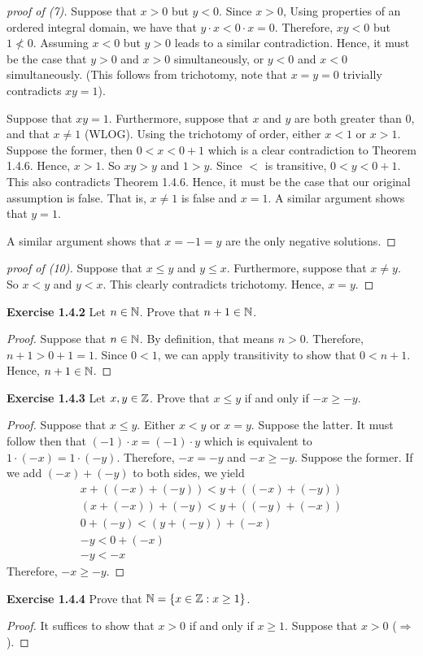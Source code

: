 \begin{proof}[proof of (7)]
    Suppose that \(x > 0\) but \(y < 0\). Since \(x > 0\), Using properties of an ordered integral domain, we have that \(y \cdot x < 0 \cdot x = 0\). Therefore, \(xy < 0\) but \(1 \nless 0\). Assuming \(x < 0\) but \(y > 0\) leads to a similar contradiction.
    Hence, it must be the case that \(y > 0\) and \(x > 0\) simultaneously, or \(y < 0\) and \(x < 0\) simultaneously. (This follows from trichotomy, note that \(x = y = 0\) trivially contradicts \(xy = 1\)).
    \par Suppose that \(xy = 1\). Furthermore, suppose that \(x\) and \(y\) are both greater than \(0\), and that \(x \neq 1\) (WLOG). Using the trichotomy of order, either \(x < 1\) or \(x > 1\). Suppose the former, then \(0 < x < 0 +1\) which is a clear contradiction to Theorem 1.4.6.
    Hence, \(x > 1\). So \(xy > y\) and \(1 > y\). Since \(<\) is transitive, \(0 < y < 0 + 1\). This also contradicts Theorem 1.4.6. Hence, it must be the case that our original assumption is false. That is, \(x \neq 1\) is false and \(x = 1\). A similar argument shows that \(y = 1\).
    \par A similar argument shows that \(x = -1 = y\) are the only negative solutions.
\end{proof}
\begin{proof}[proof of (10)]
    Suppose that \(x \leq y\) and \(y \leq x\). Furthermore, suppose that \(x \neq y\). So \(x < y\) and \(y < x\). This clearly contradicts trichotomy. Hence, \(x = y\).
\end{proof}


\noindent \textbf{Exercise 1.4.2} Let \(n \in \mathbb{N}\). Prove that \(n+1 \in \mathbb{N}\).
\begin{proof}
    Suppose that \(n \in \mathbb{N}\). By definition, that means \(n > 0\). Therefore, \(n+1 > 0 + 1 = 1\). Since \(0 < 1\), we can apply transitivity to show that \(0 < n+1\). Hence, \(n+1 \in \mathbb{N}\).
\end{proof}

\newpage
\noindent \textbf{Exercise 1.4.3} Let \(x,y \in \mathbb{Z}\). Prove that \(x \leq y\) if and only if \(-x \geq -y\).
\begin{proof}
    Suppose that \(x \leq y\). Either \(x < y\) or \(x = y\). Suppose the latter. It must follow then that \((-1) \cdot x = (-1) \cdot y\) which is equivalent to \(1 \cdot (-x) = 1 \cdot (-y)\). Therefore, \(-x = -y\) and \(-x \geq -y\).
    Suppose the former. If we add \((-x) + (-y)\) to both sides, we yield
    \begin{gather*}
        x + ((-x) + (-y)) < y + ((-x) + (-y))\\
        (x + (-x)) + (-y) < y + ((-y) + (-x))\\
        0 + (-y) < (y + (-y)) + (-x)\\
        -y < 0 + (-x)\\
        -y < -x
    \end{gather*}
    Therefore, \(-x \geq -y\).
\end{proof}


\noindent \textbf{Exercise 1.4.4} Prove that \(\mathbb{N} = \{x \in \mathbb{Z} : x \geq 1\}\).
\begin{proof}
    It suffices to show that \(x > 0\) if and only if \(x \geq 1\). Suppose that \(x > 0\) (\(\Longrightarrow\)).
\end{proof}